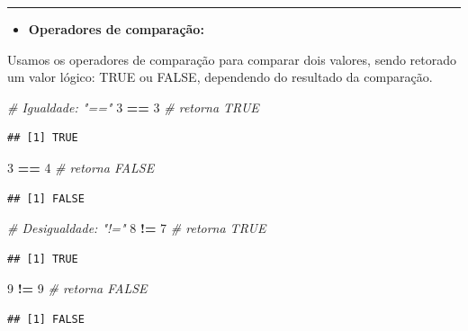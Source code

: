 \documentclass[
]{book}
\newenvironment{Shaded}{\begin{snugshade}}{\end{snugshade}}
\newcommand{\CommentTok}[1]{\textcolor[rgb]{0.56,0.35,0.01}{\textit{#1}}}
\newcommand{\DecValTok}[1]{\textcolor[rgb]{0.00,0.00,0.81}{#1}}
\newcommand{\SpecialCharTok}[1]{\textcolor[rgb]{0.81,0.36,0.00}{\textbf{#1}}}
\providecommand{\tightlist}{%
  \setlength{\itemsep}{0pt}\setlength{\parskip}{0pt}}
\begin{document}
\begin{center}\rule{0.5\linewidth}{0.5pt}\end{center}

\begin{itemize}
\tightlist
\item
  \textbf{Operadores de comparação:}
\end{itemize}

Usamos os operadores de comparação para comparar dois valores, sendo retorado um valor lógico: TRUE ou FALSE, dependendo do resultado da comparação.

\begin{Shaded}
\begin{Highlighting}[]
\CommentTok{\# Igualdade: "=="}
\DecValTok{3} \SpecialCharTok{==} \DecValTok{3} \CommentTok{\# retorna TRUE}
\end{Highlighting}
\end{Shaded}

\begin{verbatim}
## [1] TRUE
\end{verbatim}

\begin{Shaded}
\begin{Highlighting}[]
\DecValTok{3} \SpecialCharTok{==} \DecValTok{4} \CommentTok{\# retorna FALSE}
\end{Highlighting}
\end{Shaded}

\begin{verbatim}
## [1] FALSE
\end{verbatim}

\begin{Shaded}
\begin{Highlighting}[]
\CommentTok{\# Desigualdade: "!="}
\DecValTok{8} \SpecialCharTok{!=} \DecValTok{7} \CommentTok{\# retorna TRUE}
\end{Highlighting}
\end{Shaded}

\begin{verbatim}
## [1] TRUE
\end{verbatim}

\begin{Shaded}
\begin{Highlighting}[]
\DecValTok{9} \SpecialCharTok{!=} \DecValTok{9} \CommentTok{\# retorna FALSE}
\end{Highlighting}
\end{Shaded}

\begin{verbatim}
## [1] FALSE
\end{verbatim}
\end{document}
